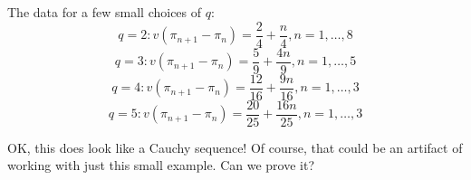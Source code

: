 \documentclass{article}
\begin{document}
The data for a few small choices of $q$:
\[q=2: v(\pi_{n+1}-\pi_n) = \frac24+\frac n4,n=1,\ldots, 8\]
\[q=3: v(\pi_{n+1}-\pi_n) = \frac59+\frac{4n}{9},n=1,\ldots,5\]
\[q=4: v(\pi_{n+1}-\pi_n) = \frac{12}{16} +\frac{9n}{16},n=1,\ldots, 3\]
\[q=5: v(\pi_{n+1}-\pi_n) = \frac{20}{25}+\frac{16n}{25},n=1,\ldots,3\]


OK, this does look like a Cauchy sequence! Of course, that could be an artifact 
of working with just this small example. Can we prove it?
\end{document}

